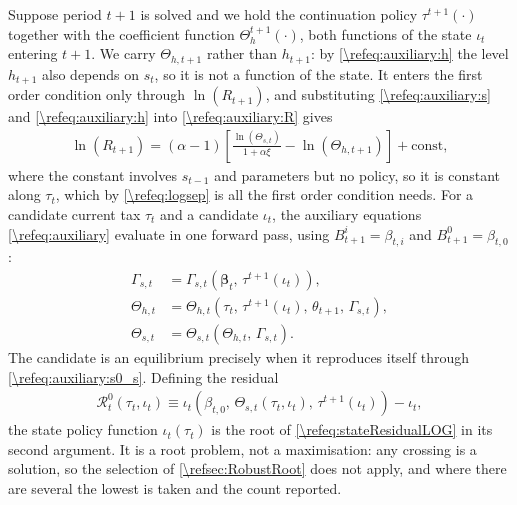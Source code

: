 Suppose period $t+1$ is solved and we hold the continuation policy $\tau^{t+1}(\cdot)$ together with the coefficient function $\Theta_h^{t+1}(\cdot)$, both functions of the state $\iota_t$ entering $t+1$. We carry $\Theta_{h,t+1}$ rather than $h_{t+1}$: by \eqref{\refeq:auxiliary:h} the level $h_{t+1}$ also depends on $s_t$, so it is not a function of the state. It enters the first order condition only through $\ln(R_{t+1})$, and substituting \eqref{\refeq:auxiliary:s} and \eqref{\refeq:auxiliary:h} into \eqref{\refeq:auxiliary:R} gives
\begin{align*}
    \ln\left(R_{t+1}\right) = (\alpha-1)\left[\frac{\ln\left(\Theta_{s,t}\right)}{1+\alpha\xi}-\ln\left(\Theta_{h,t+1}\right)\right]+\text{const},
\end{align*}
where the constant involves $s_{t-1}$ and parameters but no policy, so it is constant along $\tau_t$, which by \eqref{\refeq:logsep} is all the first order condition needs. For a candidate current tax $\tau_t$ and a candidate $\iota_t$, the auxiliary equations \eqref{\refeq:auxiliary} evaluate in one forward pass, using $B_{t+1}^i = \beta_{t,i}$ and $B_{t+1}^0 = \beta_{t,0}$:
\begin{subequations}\label{\refeq:stateApproxLOG}
\begin{align}
    \Gamma_{s,t} &= \Gamma_{s,t}\left(\bm{\beta}_t,\, \tau^{t+1}(\iota_t)\right), \label{\refeq:stateApproxLOG:Gammas} \\
    \Theta_{h,t} &= \Theta_{h,t}\left(\tau_t,\, \tau^{t+1}(\iota_t),\, \theta_{t+1},\, \Gamma_{s,t}\right), \label{\refeq:stateApproxLOG:Thetah} \\
    \Theta_{s,t} &= \Theta_{s,t}\left(\Theta_{h,t},\, \Gamma_{s,t}\right). \label{\refeq:stateApproxLOG:Thetas}
\end{align}
\end{subequations}
The candidate is an equilibrium precisely when it reproduces itself through \eqref{\refeq:auxiliary:s0_s}. Defining the residual
\begin{align}\label{\refeq:stateResidualLOG}
    \mathcal{R}_t^0\left(\tau_t,\iota_t\right) \equiv \iota_t\left(\beta_{t,0},\, \Theta_{s,t}\left(\tau_t,\iota_t\right),\, \tau^{t+1}(\iota_t)\right)-\iota_t,
\end{align}
the state policy function $\iota_t(\tau_t)$ is the root of \eqref{\refeq:stateResidualLOG} in its second argument. It is a root problem, not a maximisation: any crossing is a solution, so the selection of \cref{\refsec:RobustRoot} does not apply, and where there are several the lowest is taken and the count reported.

